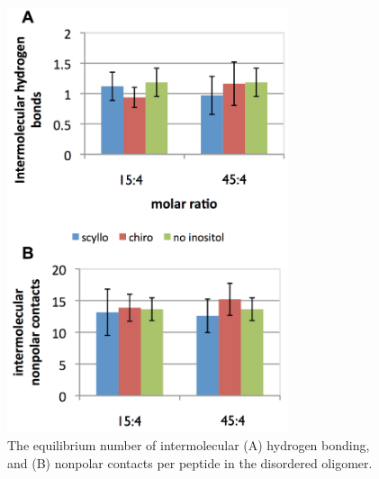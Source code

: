 \begin{figure}[ht]
\centering
\includegraphics[width=8.25cm]{figures/appendixA/inos2_figures_SI_disorderedNumContacts.pdf}
\caption[The equilibrium number of intermolecular contacts per peptide in the disordered oligomer]{The equilibrium number of intermolecular (A) hydrogen bonding, and (B) nonpolar contacts per peptide in the disordered oligomer.}
\label{fig:SI-disorderedNumContacts}
\end{figure}

